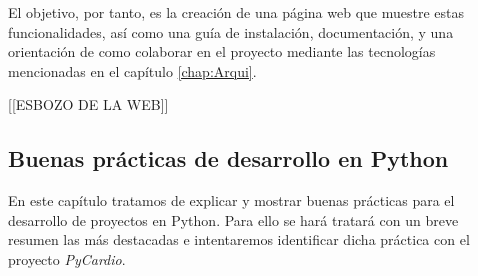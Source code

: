 El objetivo, por tanto, es la creación de una página web que muestre estas funcionalidades, así como una guía de instalación, documentación, y una orientación de como colaborar en el proyecto mediante las tecnologías mencionadas en el capítulo \ref{chap:Arqui}.

[[ESBOZO DE LA WEB]]

\subsection{Buenas prácticas de desarrollo en Python}
\label{subsec:bestPracticses}
En este capítulo tratamos de explicar y mostrar buenas prácticas para el desarrollo de proyectos en Python. Para ello se hará tratará con un breve resumen las más destacadas e intentaremos identificar dicha práctica con el proyecto \emph{PyCardio}.
